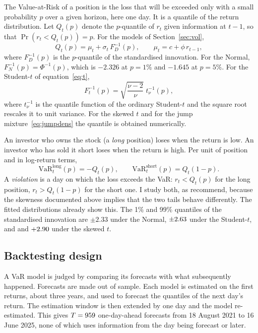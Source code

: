 \documentclass[11pt,a4paper]{article}
\begin{document}
The Value-at-Risk of a position is the loss that will be exceeded only with a small probability $p$ over a given horizon, here one day. It is a quantile of the return distribution. Let $Q_t(p)$ denote the $p$-quantile of $r_t$ given information at $t-1$, so that $\Pr(r_t<Q_t(p))=p$. For the models of Section~\ref{sec:vol},
\begin{equation}\label{eq:q}
Q_t(p)=\mu_t+\sigma_t\,F_D^{-1}(p),\qquad \mu_t=c+\phi\,r_{t-1},
\end{equation}
where $F_D^{-1}(p)$ is the $p$-quantile of the standardised innovation. For the Normal, $F_N^{-1}(p)=\Phi^{-1}(p)$, which is $-2.326$ at $p=1\%$ and $-1.645$ at $p=5\%$. For the Student-$t$ of equation~\eqref{eq:t},
\begin{equation}
F_t^{-1}(p)=\sqrt{\frac{\nu-2}{\nu}}\;t_\nu^{-1}(p),
\end{equation}
where $t_\nu^{-1}$ is the quantile function of the ordinary Student-$t$ and the square root rescales it to unit variance. For the skewed $t$ and for the jump mixture~\eqref{eq:jumpdens} the quantile is obtained numerically.

An investor who owns the stock (a \emph{long} position) loses when the return is low. An investor who has sold it short loses when the return is high. Per unit of position and in log-return terms,
\begin{equation}
\mathrm{VaR}^{\text{long}}_t(p)=-Q_t(p),\qquad \mathrm{VaR}^{\text{short}}_t(p)=Q_t(1-p).
\end{equation}
A \emph{violation} is a day on which the loss exceeds the VaR: $r_t<Q_t(p)$ for the long position, $r_t>Q_t(1-p)$ for the short one. I study both, as \citet{giotlaurent2003} recommend, because the skewness documented above implies that the two tails behave differently. The fitted distributions already show this. The 1\% and 99\% quantiles of the standardised innovation are $\pm2.33$ under the Normal, $\pm2.63$ under the Student-$t$, and \esQone{} and $+2.90$ under the skewed $t$.

\subsection{Backtesting design}

A VaR model is judged by comparing its forecasts with what subsequently happened. Forecasts are made out of sample. Each model is estimated on the first \oosWindow{} returns, about three years, and used to forecast the quantiles of the next day's return. The estimation window is then extended by one day and the model re-estimated. This gives $T=959$ one-day-ahead forecasts from 18 August 2021 to 16 June 2025, none of which uses information from the day being forecast or later.
\end{document}
